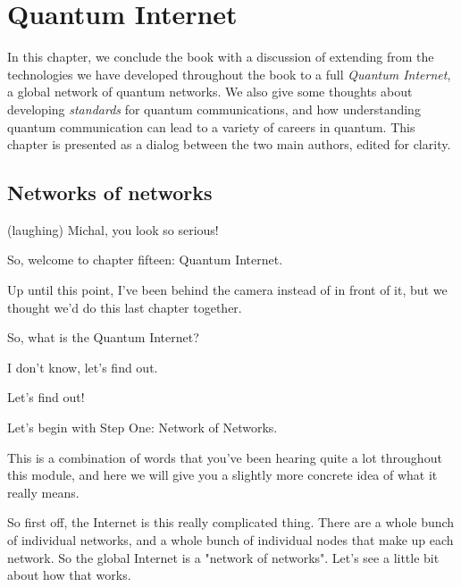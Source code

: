 \chapter{Quantum Internet}

In this chapter, we conclude the book with a discussion of extending from the technologies we have developed throughout the book to a full \emph{Quantum Internet}, a global network of quantum networks. We also give some thoughts about developing \emph{standards} for quantum communications, and how understanding quantum communication can lead to a variety of careers in quantum. This chapter is presented as a dialog between the two main authors, edited for clarity.

\section{Networks of networks}

\rrr (laughing) Michal, you look so serious!

So, welcome to chapter fifteen: Quantum Internet.

Up until this point, I've been behind the camera instead of in front of it, but we thought we'd do this last chapter together.

\mmm So, what is the Quantum Internet?

\rrr I don't know, let's find out. 

\mmm Let's find out!

Let's begin with Step One: Network of Networks.

This is a combination of words that you've been hearing quite a lot throughout this module, and here we will give you a slightly more concrete idea of what it really means.

\rrr So first off, the Internet is this really complicated thing. There are a whole bunch of individual networks, and a whole bunch of individual nodes that make up each network. So the global Internet is a "network of networks". Let's see a little bit about how that works.

